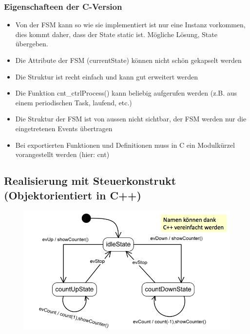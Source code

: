 \subsubsection{Eigenschafteen der C-Version}
\begin{itemize}
  \item Von der FSM kann so wie sie implementiert ist nur eine Instanz vorkommen, dies kommt daher, dass der State static ist. Mögliche Lösung, State übergeben.
  \item Die Attribute der FSM (currentState) können nicht schön gekapselt werden
  \item Die Struktur ist recht einfach und kann gut erweitert werden
  \item Die Funktion cnt\_ctrlProcess() kann beliebig aufgerufen werden (z.B. aus einem periodischen Task, laufend, etc.)
  \item Die Struktur der FSM ist von aussen nicht sichtbar, der FSM werden nur die eingetretenen Events übertragen
  \item Bei exportierten Funktionen und Definitionen muss in C ein Modulkürzel vorangestellt werden (hier: cnt)
\end{itemize}


\subsection{Realisierung mit Steuerkonstrukt (Objektorientiert in
  C++)}

\begin{figure}[h]
  \centering
  \includegraphics[scale = 0.35]{images/FSM/Up_down_counter_obj}
\end{figure}

